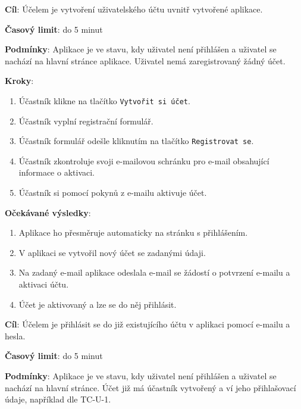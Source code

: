 
\vspace{1em}

\textbf{Cíl}: Účelem je vytvoření uživatelského účtu uvnitř vytvořené aplikace.

\textbf{Časový limit}: do 5 minut

\textbf{Podmínky}: Aplikace je ve stavu, kdy uživatel není přihlášen a uživatel se nachází na hlavní stránce aplikace. Uživatel nemá zaregistrovaný žádný účet.

\textbf{Kroky}:

\begin{enumerate}[leftmargin=1.4cm]
    \item Účastník klikne na tlačítko \verb|Vytvořit si účet|.
    \item Účastník vyplní registrační formulář.
    \item Účastník formulář odešle kliknutím na tlačítko \verb|Registrovat se|.
    \item Účastník zkontroluje svoji e-mailovou schránku pro e-mail obsahující informace o aktivaci.
    \item Účastník si pomocí pokynů z e-mailu aktivuje účet.
\end{enumerate}

\textbf{Očekávané výsledky}:

\begin{enumerate}[leftmargin=1.4cm]
    \item Aplikace ho přesměruje automaticky na stránku s přihlášením.
    \item V aplikaci se vytvořil nový účet se zadanými údaji.
    \item Na zadaný e-mail aplikace odeslala e-mail se žádostí o potvrzení e-mailu a aktivaci účtu.
    \item Účet je aktivovaný a lze se do něj přihlásit.
\end{enumerate}


\vspace{1em}

\textbf{Cíl}: Účelem je přihlásit se do již existujícího účtu v aplikaci pomocí e-mailu a hesla.

\textbf{Časový limit}: do 5 minut

\textbf{Podmínky}: Aplikace je ve stavu, kdy uživatel není přihlášen a uživatel se nachází na hlavní stránce. Účet již má účastník vytvořený a ví jeho přihlašovací údaje, například dle TC-U-1.


